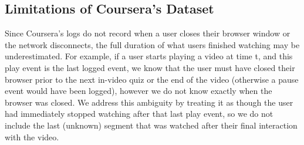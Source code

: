 \documentclass{sigchi}
\begin{document}

\subsection{Limitations of Coursera's Dataset}

Since Coursera's logs do not record when a user closes their browser window or the network disconnects, the full duration of what users finished watching may be underestimated. For example, if a user starts playing a video at time t, and this play event is the last logged event, we know that the user must have closed their browser prior to the next in-video quiz or the end of the video (otherwise a pause event would have been logged), however we do not know exactly when the browser was closed. We address this ambiguity by treating it as though the user had immediately stopped watching after that last play event, so we do not include the last (unknown) segment that was watched after their final interaction with the video. %


\end{document}
